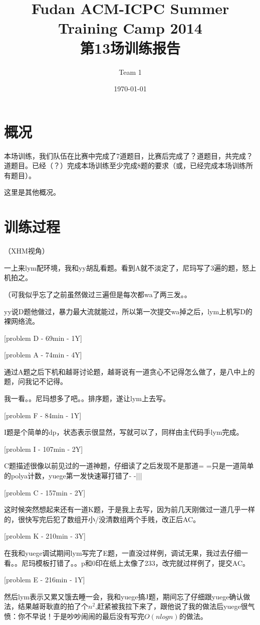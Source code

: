 \documentclass[a4paper, 11pt, nofonts, nocap, fancyhdr]{ctexart}
\title{Fudan ACM-ICPC Summer Training Camp 2014\\第13场训练报告}
\author{Team 1}
\date{\today}
\begin{document}
\maketitle

\section{概况}

本场训练，我们队伍在比赛中完成了7道题目，比赛后完成了？道题目，共完成？道题目。已经（？）完成本场训练至少完成8题的要求（或，已经完成本场训练所有题目）。

这里是其他概况。

\section{训练过程}

（XHM视角）

一上来lym配环境，我和yy胡乱看题。看到A就不淡定了，尼玛写了3遍的题，怒上机拍之。

（可我似乎忘了之前虽然做过三遍但是每次都wa了两三发。。

yy说D题他做过，暴力最大流就能过，所以第一次提交wa掉之后，lym上机写D的裸网络流。

[problem D - 69min - 1Y]

[problem A - 74min - 4Y]

通过A题之后下机和越哥讨论题，越哥说有一道贪心不记得怎么做了，是八中上的题，问我记不记得。

我一看。。尼玛想多了吧。。排序题，遂让lym上去写。

[problem F - 84min - 1Y]

I题是个简单的dp，状态表示很显然，写就可以了，同样由主代码手lym完成。

[problem I - 107min - 2Y]

C题描述很像以前见过的一道神题，仔细读了之后发现不是那道= =只是一道简单的polya计数，yuege第一发快速幂打错了- -|||

[problem C - 157min - 2Y]

这时候突然想起来还有一道K题，于是我上去写，因为前几天刚做过一道几乎一样的，很快写完后犯了数组开小/没清数组两个手贱，改正后AC。

[problem K - 210min - 3Y]

在我和yuege调试期间lym写完了E题，一直没过样例，调试无果，我过去仔细一看。。尼玛模板打错了。。p和0印在纸上太像了233，改完就过样例了，提交AC。

[problem E - 216min - 1Y]

然后lym表示又累又饿去睡一会，我和yuege搞J题，期间忘了仔细跟yuege确认做法，结果越哥耿直的拍了个$n^2$,赶紧被我拉下来了，跟他说了我的做法后yuege很气愤：你不早说！于是吵吵闹闹的最后没有写完$O(nlogn)$的做法。
\end{document}
